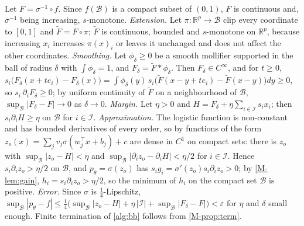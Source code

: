 \documentclass[11pt,a4paper]{article}
\newcommand{\R}{\mathbb{R}}
\newcommand{\B}{\mathcal{B}}
\newcommand{\I}{\mathcal{I}}
\newcommand{\sig}{\sigma}
\begin{document}
\paragraph{}
Let $F=\sig^{-1}\circ f$. Since $f(\B)$ is a compact subset of $(0,1)$, $F$ is continuous and, $\sig^{-1}$ being
increasing, $s$-monotone. \emph{Extension.} Let $\pi:\R^p\to\B$ clip every coordinate to $[0,1]$ and
$\tilde F=F\circ\pi$; $\tilde F$ is continuous, bounded and $s$-monotone on $\R^p$, because increasing $x_i$ increases
$\pi(x)_i$ or leaves it unchanged and does not affect the other coordinates. \emph{Smoothing.} Let $\phi_\delta\ge0$ be a
smooth mollifier supported in the ball of radius $\delta$ with $\int\phi_\delta=1$, and $F_\delta=\tilde F*\phi_\delta$.
Then $F_\delta\in C^\infty$, and for $t\ge0$,
$s_i\bigl(F_\delta(x+te_i)-F_\delta(x)\bigr)=\int\phi_\delta(y)\,s_i\bigl(\tilde F(x-y+te_i)-\tilde F(x-y)\bigr)dy\ge0$, so
$s_i\,\partial_iF_\delta\ge0$; by uniform continuity of $\tilde F$ on a neighbourhood of $\B$,
$\sup_\B|F_\delta-F|\to0$ as $\delta\to0$. \emph{Margin.} Let $\eta>0$ and
$H=F_\delta+\eta\sum_{i\in\I}s_ix_i$; then $s_i\partial_iH\ge\eta$ on $\B$ for $i\in\I$. \emph{Approximation.} The
logistic function is non-constant and has bounded derivatives of every order, so by \citet[Theorem 3]{Hornik1991} functions of the form
$z_o(x)=\sum_jv_j\sig(w_j^\top x+b_j)+c$ are dense in $C^1$ on compact sets: there is $z_o$ with
$\sup_\B|z_o-H|<\eta$ and $\sup_\B|\partial_iz_o-\partial_iH|<\eta/2$ for $i\in\I$. Hence
$s_i\partial_iz_o>\eta/2$ on $\B$, and $p_\theta=\sig(z_o)$ has $s_ig_i=\sig'(z_o)s_i\partial_iz_o>0$; by
\cref{M-lem:gain}, $h_i=s_i\partial_iz_o>\eta/2$, so the minimum of $h_i$ on the compact set $\B$ is positive.
\emph{Error.} Since $\sig$ is $\tfrac14$-Lipschitz,
$\sup_\B|p_\theta-f|\le\tfrac14\bigl(\sup_\B|z_o-H|+\eta\,|\I|+\sup_\B|F_\delta-F|\bigr)<\varepsilon$ for $\eta$ and
$\delta$ small enough. Finite termination of \cref{alg:bb} follows from \cref{M-prop:term}.
\end{document}
